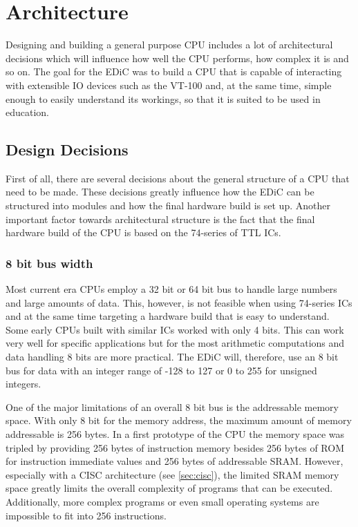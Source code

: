 \chapter{Architecture}\label{cha:architecture}
Designing and building a general purpose \gls{CPU} includes a lot of architectural decisions which will influence how well the \gls{CPU} performs, how complex it is and so on.
The goal for the \gls{EDiC} was to build a \gls{CPU} that is capable of interacting with extensible \gls{IO} devices such as the VT-100 and, at the same time, simple enough to easily understand its workings, so that it is suited to be used in education.

\section{Design Decisions}
First of all, there are several decisions about the general structure of a \gls{CPU} that need to be made.
These decisions greatly influence how the \gls{EDiC} can be structured into modules and how the final hardware build is set up.
Another important factor towards architectural structure is the fact that the final hardware build of the \gls{CPU} is based on the 74-series of \gls{TTL} \glspl{IC}.

\subsection{8 bit bus width}
Most current era \glspl{CPU} employ a 32 bit or 64 bit bus to handle large numbers and large amounts of data.
This, however, is not feasible when using 74-series \glspl{IC} and at the same time targeting a hardware build that is easy to understand.
Some early \glspl{CPU} built with similar \glspl{IC} worked with only 4 bits.
This can work very well for specific applications but for the most arithmetic computations and data handling 8 bits are more practical.
The \gls{EDiC} will, therefore, use an 8 bit bus for data with an integer range of -128 to 127 or 0 to 255 for unsigned integers.

One of the major limitations of an overall 8 bit bus is the addressable memory space.
With only 8 bit for the memory address, the maximum amount of memory addressable is 256 bytes.
In a first prototype of the \gls{CPU} the memory space was tripled by providing 256 bytes of instruction memory besides 256 bytes of \gls{ROM} for instruction immediate values and 256 bytes of addressable \gls{SRAM}.
However, especially with a \gls{CISC} architecture (see \cref{sec:cisc}), the limited \gls{SRAM} memory space greatly limits the overall complexity of programs that can be executed.
Additionally, more complex programs or even small operating systems are impossible to fit into 256 instructions.

